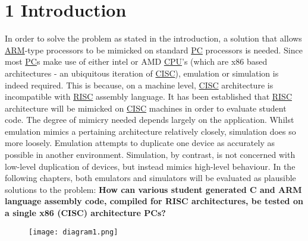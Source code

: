 

\chapter*{1 Introduction}
\label{intro}

In order to solve the problem as stated in the \color{blue}introduction\color{black}, a solution that allows \hyperref[listAbr]{ARM}-type processors to be mimicked on standard \hyperref[listAbr]{PC} processors is needed. Since most \hyperref[listAbr]{PC}s make use of either intel\textsuperscript{{\tiny{\textregistered}}} or AMD\textsuperscript{{\tiny{\textregistered}}} \hyperref[listAbr]{CPU}'s (which are x86 based architectures - an ubiquitous iteration of \hyperref[listAbr]{CISC}), emulation or simulation is indeed required. This is because, on a machine level, \hyperref[listAbr]{CISC} architecture is incompatible with \hyperref[listAbr]{RISC} assembly language.
It has been established that \hyperref[listAbr]{RISC} architecture will be mimicked on \hyperref[listAbr]{CISC} machines in order to evaluate student code. The degree of mimicry needed depends largely on the application. Whilst emulation mimics a pertaining architecture relatively closely, simulation does so more loosely. Emulation attempts to duplicate one device as accurately as possible in another environment. Simulation, by contrast, is not concerned with low-level duplication of devices, but instead mimics high-level behaviour.\cite{Chris}
In the following chapters, both emulators and simulators will be evaluated as plausible solutions to the problem: \textbf{How can various student generated C and ARM language assembly code, compiled for RISC architectures, be tested on a single x86 (CISC) architecture PCs?} 

\begin{figure}[H]
\begin{center}
\texttt{[image: diagram1.png]}
\end{center}
\end{figure}
